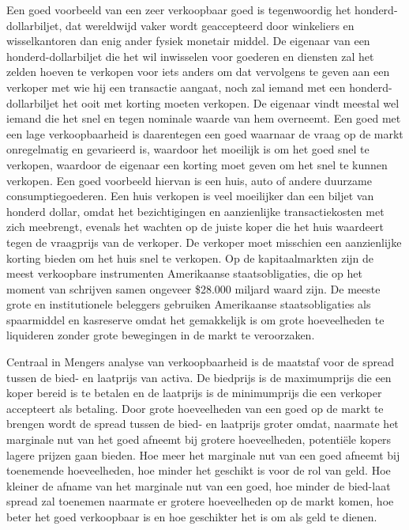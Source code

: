 \documentclass[
  a5paper,
  smalldemyvopaper,11pt,twoside,onecolumn,openright,extrafontsizes,
hidelinks]{memoir}
\begin{document}
Een goed voorbeeld van een zeer verkoopbaar goed is tegenwoordig het
honderd-dollarbiljet, dat wereldwijd vaker wordt geaccepteerd door
winkeliers en wisselkantoren dan enig ander fysiek monetair middel. De
eigenaar van een honderd-dollarbiljet die het wil inwisselen voor
goederen en diensten zal het zelden hoeven te verkopen voor iets anders
om dat vervolgens te geven aan een verkoper met wie hij een transactie
aangaat, noch zal iemand met een honderd-dollarbiljet het ooit met
korting moeten verkopen. De eigenaar vindt meestal wel iemand die het
snel en tegen nominale waarde van hem overneemt. Een goed met een lage
verkoopbaarheid is daarentegen een goed waarnaar de vraag op de markt
onregelmatig en gevarieerd is, waardoor het moeilijk is om het goed snel
te verkopen, waardoor de eigenaar een korting moet geven om het snel te
kunnen verkopen. Een goed voorbeeld hiervan is een huis, auto of andere
duurzame consumptiegoederen. Een huis verkopen is veel moeilijker dan
een biljet van honderd dollar, omdat het bezichtigingen en aanzienlijke
transactiekosten met zich meebrengt, evenals het wachten op de juiste
koper die het huis waardeert tegen de vraagprijs van de verkoper. De
verkoper moet misschien een aanzienlijke korting bieden om het huis snel
te verkopen. Op de kapitaalmarkten zijn de meest verkoopbare
instrumenten Amerikaanse staatsobligaties, die op het moment van
schrijven samen ongeveer \$28.000 miljard waard zijn. De meeste grote en
institutionele beleggers gebruiken Amerikaanse staatsobligaties als
spaarmiddel en kasreserve omdat het gemakkelijk is om grote hoeveelheden
te liquideren zonder grote bewegingen in de markt te veroorzaken.

Centraal in Mengers analyse van verkoopbaarheid is de maatstaf voor de
spread tussen de bied- en laatprijs van activa. De biedprijs is de
maximumprijs die een koper bereid is te betalen en de laatprijs is de
minimumprijs die een verkoper accepteert als betaling. Door grote
hoeveelheden van een goed op de markt te brengen wordt de spread tussen
de bied- en laatprijs groter omdat, naarmate het marginale nut van het
goed afneemt bij grotere hoeveelheden, potentiële kopers lagere prijzen
gaan bieden. Hoe meer het marginale nut van een goed afneemt bij
toenemende hoeveelheden, hoe minder het geschikt is voor de rol van
geld. Hoe kleiner de afname van het marginale nut van een goed, hoe
minder de bied-laat spread zal toenemen naarmate er grotere hoeveelheden
op de markt komen, hoe beter het goed verkoopbaar is en hoe geschikter
het is om als geld te dienen.
\end{document}

